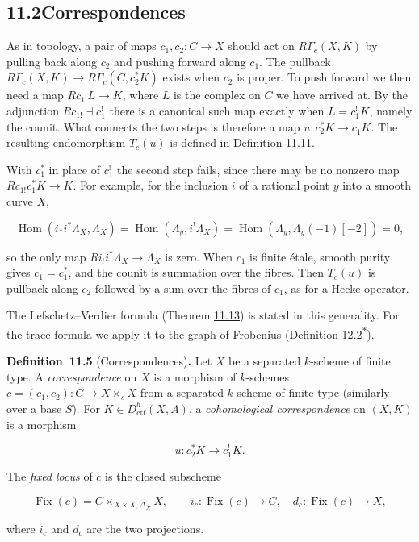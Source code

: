 \documentclass[11pt]{article}
\newenvironment{bpstatement}[2]{\par\addvspace{0.6\baselineskip}\noindent\textbf{#1}#2\textbf{.}\enspace\ignorespaces}
  {\par\addvspace{0.4\baselineskip}}
\newcommand{\bpout}[1]{#1\textsuperscript{\hyperlink{bp-outside}{\ensuremath{\ast}}}}
\providecommand{\Fix}{}\renewcommand{\Fix}{\operatorname{Fix}}
\begin{document}
\subsection*{\texorpdfstring{11.2\quad Correspondences}{11.2 Correspondences}}
\label{bp13}%
\label{bp14}%
As in topology, a pair of maps \(c_1,c_2:C\to X\) should act on \(R\Gamma_c(X,K)\) by pulling back along \(c_2\) and pushing forward along \(c_1\). The pullback \(R\Gamma_c(X,K)\to R\Gamma_c(C,c_2^*K)\) exists when \(c_2\) is proper. To push forward we then need a map \(Rc_{1!}L\to K\), where \(L\) is the complex on \(C\) we have arrived at. By the adjunction \(Rc_{1!}\dashv c_1^!\) there is a canonical such map exactly when \(L=c_1^!K\), namely the counit. What connects the two steps is therefore a map \(u:c_2^*K\to c_1^!K\). The resulting endomorphism \(T_c(u)\) is defined in Definition \hyperref[bp33]{11.11}.

With \(c_1^*\) in place of \(c_1^!\) the second step fails, since there may be no nonzero map \(Rc_{1!}c_1^*K\to K\). For example, for the inclusion \(i\) of a rational point \(y\) into a smooth curve \(X\),

\[
\operatorname{Hom}(i_*i^*\Lambda_X,\Lambda_X)
=\operatorname{Hom}(\Lambda_y,i^!\Lambda_X)
=\operatorname{Hom}(\Lambda_y,\Lambda_y(-1)[-2])=0,
\]

so the only map \(Ri_!i^*\Lambda_X\to\Lambda_X\) is zero. When \(c_1\) is finite étale, smooth purity gives \(c_1^!=c_1^*\), and the counit is summation over the fibres. Then \(T_c(u)\) is pullback along \(c_2\) followed by a sum over the fibres of \(c_1\), as for a Hecke operator.

The Lefschetz–Verdier formula (Theorem \hyperref[bp37]{11.13}) is stated in this generality. For the trace formula we apply it to the graph of Frobenius (Definition \bpout{12.2}).

\label{bp15}%
\begin{bpstatement}{Definition~11.5}{ (Correspondences)}
Let \(X\) be a separated \(k\)-scheme of finite type. A \emph{correspondence} on \(X\) is a morphism of \(k\)-schemes \(c=(c_1,c_2):C\to X\times_sX\) from a separated \(k\)-scheme of finite type (similarly over a base \(S\)). For \(K\in D^b_{\mathrm{ctf}}(X,A)\), a \emph{cohomological correspondence} on \((X,K)\) is a morphism

\[
u:c_2^*K\longrightarrow c_1^!K.
\]

The \emph{fixed locus} of \(c\) is the closed subscheme

\[
\Fix(c)=C\times_{X\times X,\Delta_X}X,
\qquad i_c:\Fix(c)\longrightarrow C,\quad d_c:\Fix(c)\longrightarrow X,
\]

where \(i_c\) and \(d_c\) are the two projections.
\end{bpstatement}
\end{document}
